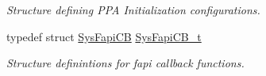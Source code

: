 \begin{DoxyCompactItemize}
\begin{DoxyCompactList}\small\item\em Structure defining P\-P\-A Initialization configurations. \end{DoxyCompactList}\item 
\hypertarget{group__FAPI__SYSTEM_ga0ef47df81f69cd0477bf1849bac388ba}{typedef struct \hyperlink{structSysFapiCB}{Sys\-Fapi\-C\-B} \hyperlink{group__FAPI__SYSTEM_ga0ef47df81f69cd0477bf1849bac388ba}{Sys\-Fapi\-C\-B\-\_\-t}}\label{group__FAPI__SYSTEM_ga0ef47df81f69cd0477bf1849bac388ba}

\begin{DoxyCompactList}\small\item\em Structure definintions for fapi callback functions. \end{DoxyCompactList}\end{DoxyCompactItemize}
